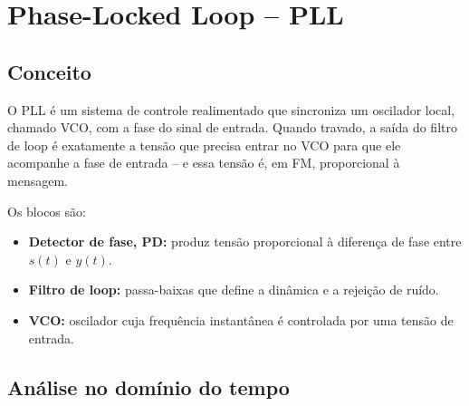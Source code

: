 \documentclass[11pt,a4paper]{article}
\begin{document}
\section{Phase-Locked Loop -- PLL}

\subsection{Conceito}

O PLL é um sistema de controle realimentado que sincroniza um oscilador local, chamado VCO, com a fase do sinal de entrada. Quando travado, a saída do filtro de loop é exatamente a tensão que precisa entrar no VCO para que ele acompanhe a fase de entrada -- e essa tensão é, em FM, proporcional à mensagem.

\begin{center}
\end{center}

Os blocos são:
\begin{itemize}
  \item \textbf{Detector de fase, PD:} produz tensão proporcional à diferença de fase entre $s(t)$ e $y(t)$.
  \item \textbf{Filtro de loop:} passa-baixas que define a dinâmica e a rejeição de ruído.
  \item \textbf{VCO:} oscilador cuja frequência instantânea é controlada por uma tensão de entrada.
\end{itemize}

\subsection{Análise no domínio do tempo}
\end{document}

